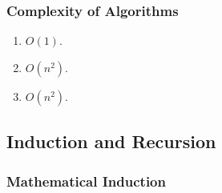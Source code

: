 \documentclass{../../cls/sig-alternate-05-2015}
\begin{document}
\subsubsection{Complexity of Algorithms}
\begin{enumerate}
\item $O(1)$.
\item $O(n^2)$.
\item $O(n^2)$.
\end{enumerate}

\subsection{Induction and Recursion}
\subsubsection{Mathematical Induction}
\end{document}
